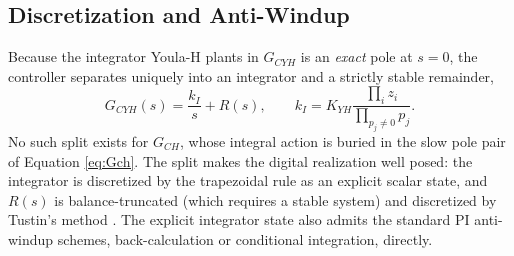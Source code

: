 %
%

\subsection{Discretization and Anti-Windup}
\label{sec:antiwindup}
Because the integrator Youla-H plants in $G_{CYH}$ is an \emph{exact} pole at $s=0$,
the controller separates uniquely into an integrator and a strictly stable remainder,
\begin{equation} \label{eq:split}
G_{CYH}(s) = \frac{k_I}{s} + R(s), \qquad
k_I = K_{YH}\frac{\prod_{i} z_i}{\prod_{p_j\neq 0} p_j}.
\end{equation}
No such split exists for $G_{CH}$, whose integral action is buried in the slow pole
pair of Equation \ref{eq:Gch}. The split makes the digital realization well posed:
the integrator is discretized by the trapezoidal rule as an explicit scalar state,
and $R(s)$ is balance-truncated (which requires a stable system) and discretized by
Tustin's method \citep{tustin1947method}. The explicit integrator state also admits the
standard PI anti-windup schemes, back-calculation or conditional integration, directly.

